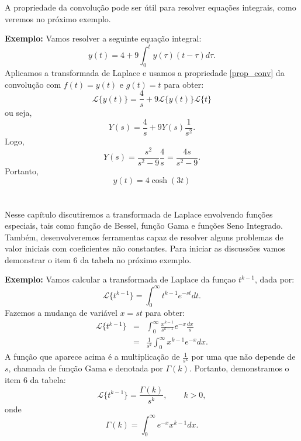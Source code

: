 \documentclass[a4paper,10pt]{book}
\begin{document}
 
 
 A propriedade  da convolução pode ser útil para resolver equações integrais, como veremos no próximo exemplo.

 {\bf Exemplo:} Vamos resolver a seguinte equação integral:
 \begin{equation}
 y(t)=4+9\int_0^t y(\tau)(t-\tau)d\tau.
 \end{equation}
 Aplicamos a transformada de Laplace e usamos a propriedade \ref{prop_conv} da convolução com $f(t)=y(t)$ e $g(t)=t$ para obter:
 \begin{equation}
 \mathcal{L}\{y(t)\}=\frac{4}{s}+9\mathcal{L}\{y(t)\}\mathcal{L}\{t\}
 \end{equation}
 ou seja,
 \begin{equation}
 Y(s)=\frac{4}{s}+9Y(s)\frac{1}{s^2}.
 \end{equation}
 Logo,
 \begin{equation}
 Y(s)=\frac{s^2}{s^2-9}\frac{4}{s}=\frac{4s}{s^2-9}.
 \end{equation}
 Portanto,
 \begin{equation}
 y(t)=4\cosh(3t)
 \end{equation}


 \section{}
 
Nesse capítulo discutiremos a transformada de Laplace envolvendo funções especiais, tais como função de Bessel, função Gama e funções Seno Integrado. Também, desenvolveremos ferramentas capaz de resolver alguns problemas de valor iniciais com coeficientes não constantes.
Para iniciar as discussões vamos demonstrar o item 6 da tabela  no próximo exemplo.


{\bf Exemplo: }Vamos calcular a transformada de Laplace da funçao $t^{k-1}$, dada por:
\begin{equation}
\mathcal{L}\{t^{k-1} \}=\int_0^\infty t^{k-1} e^{-st}dt.
\end{equation}
Fazemos a mudança de variável $x=st$ para obter:
\begin{eqnarray*}
 \mathcal{L}\{t^{k-1} \}&=&\int_0^\infty \frac{x^{k-1}}{s^{k-1}}e^{-x}\frac{dx}{s}\\
 &=&\frac{1}{s^k}\int_0^\infty x^{k-1}e^{-x} dx.
 \end{eqnarray*}
A função que aparece acima é a multiplicação de $\frac{1}{s^k}$ por uma que não depende de $s$, chamada de função Gama e denotada por $\Gamma(k)$. Portanto, demonstramos o item 6 da tabela:
\begin{equation}
\mathcal{L}\{t^{k-1} \}=\frac{\Gamma(k)}{s^k},\qquad k>0,
\end{equation}
onde
\begin{equation}
\Gamma(k)=\int_0^\infty e^{-x}x^{k-1}dx.
\end{equation}
\end{document}
